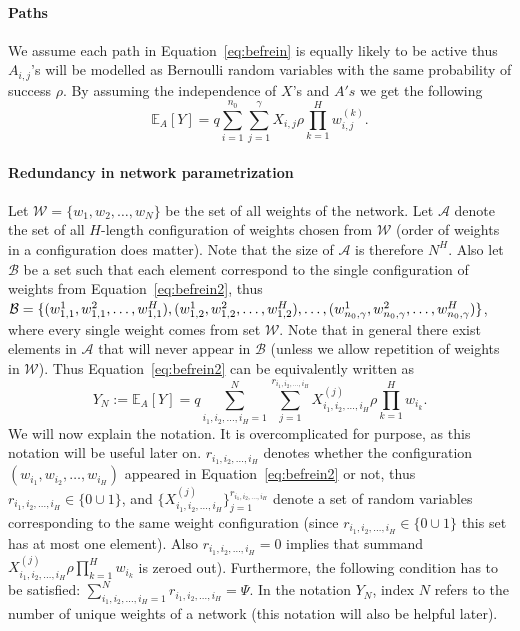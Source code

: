 \documentclass[twoside]{article}
\begin{document}
\paragraph{Paths}
We assume each path in Equation~\ref{eq:befrein} is equally likely to be active thus $A_{i,j}$'s will be modelled as Bernoulli random variables with the same probability of success $\rho$. By assuming the independence of $X$'s and $A's$ we get the following
\begin{equation}
\mathbb{E}_A[Y] = q\sum_{i=1}^{n_0}\sum_{j = 1}^\gamma X_{i,j}\rho\prod_{k = 1}^{H}w_{i,j}^{(k)}.
\label{eq:befrein2}
\end{equation}

\paragraph{Redundancy in network parametrization}
Let $\mathcal{W} = \{w_1,w_2,\dots,w_N\}$ be the set of all weights of the network. Let $\mathcal{A}$ denote the set of all $H$-length configuration of weights chosen from $\mathcal{W}$ (order of weights in a configuration does matter). Note that the size of $\mathcal{A}$ is therefore $N^H$. Also let $\mathcal{B}$ be a set such that each element correspond to the single configuration of weights from Equation~\ref{eq:befrein2}, thus $\mathcal{B} = \{(w_{1,1}^1,w_{1,1}^2,\dots,w_{1,1}^H),(w_{1,2}^1,w_{1,2}^2,\dots,w_{1,2}^H),\dots,\\(w_{n_0,\gamma}^1,w_{n_0,\gamma}^2,\dots,w_{n_0,\gamma}^H)\}$, where every single weight comes from set $\mathcal{W}$. Note that in general there exist elements in $\mathcal{A}$ that will never appear in $\mathcal{B}$ (unless we allow repetition of weights in $\mathcal{W}$). Thus Equation~\ref{eq:befrein2} can be equivalently written as 
\begin{equation}
Y_N \!:=\! \mathbb{E}_A[Y] \!=\! q\!\!\!\!\sum_{i_1,i_2,\dots,i_H=1}^{N}\!\!\!\!\!\!\!\sum_{j = 1}^{r_{i_1\!,i_2,\dots,i_H}}\!\!\!\!\!X_{i_1,i_2,\dots,i_H}^{(j)}\rho\!\prod_{k = 1}^{H}\!\!w_{i_k}.
\label{eq:befapprox}
\end{equation}
We will now explain the notation. It is overcomplicated for purpose, as this notation will be useful later on. $r_{i_1,i_2,\dots,i_H}$ denotes whether the configuration $(w_{i_1},w_{i_2},\dots,w_{i_H})$ appeared in Equation~\ref{eq:befrein2} or not, thus $r_{i_1,i_2,\dots,i_H} \in \{0\cup{1}\}$, and $\{X_{i_1,i_2,\dots,i_H}^{(j)}\}_{j=1}^{r_{i_1,i_2,\dots,i_H}}$ denote a set of random variables corresponding to the same weight configuration (since $r_{i_1,i_2,\dots,i_H} \in \{0\cup{1}\}$ this set has at most one element). Also $r_{i_1,i_2,\dots,i_H} = 0$ implies that summand $X_{i_1,i_2,\dots,i_H}^{(j)}\rho\prod_{k = 1}^{H}w_{i_k}$ is zeroed out). Furthermore, the following condition has to be satisfied: $\sum_{i_1,i_2,\dots,i_H=1}^{N}r_{i_1,i_2,\dots,i_H} = \Psi$. In the notation $Y_N$, index $N$ refers to the number of unique weights of a network (this notation will also be helpful later).  
\end{document}
